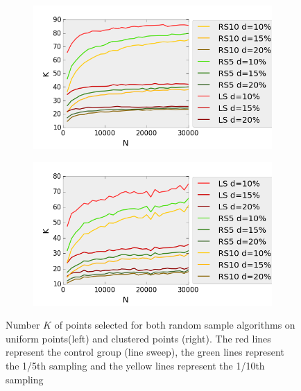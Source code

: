 \begin{figure}[H] 
  \begin{subfigure}[b]{0.5\linewidth}
    \centering
    \includegraphics[width=0.9\linewidth]{Pictures/unif_ls_rs_k} 
    \label{fig:unif_ls_rs_k} 
    \vspace{4ex}
  \end{subfigure}%
  \begin{subfigure}[b]{0.5\linewidth}
    \centering
    \includegraphics[width=0.9\linewidth]{Pictures/clus_ls_rs_k} 
    \label{fig:clus_ls_rs_k} 
    \vspace{4ex}
  \end{subfigure}
  \caption[Number $K$ of points selected for both random sample algorithms on uniform and clustered points]{Number $K$ of points selected for both random sample algorithms on uniform points(left) and clustered points (right). The red lines represent the control group (line sweep), the green lines represent the 1/5th sampling and the yellow lines represent the 1/10th sampling}
  \label{fig:ls_rs_k} 
\end{figure}

